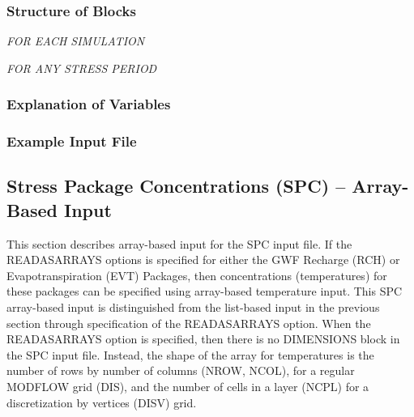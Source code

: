 \vspace{5mm}
\subsubsection{Structure of Blocks}
\vspace{5mm}

\noindent \textit{FOR EACH SIMULATION}


\vspace{5mm}
\noindent \textit{FOR ANY STRESS PERIOD}


\vspace{5mm}
\subsubsection{Explanation of Variables}
\begin{description}

\end{description}

\subsubsection{Example Input File}


\newpage
\subsection{Stress Package Concentrations (SPC) -- Array-Based Input}

This section describes array-based input for the SPC input file.  If the READASARRAYS options is specified for either the GWF Recharge (RCH) or Evapotranspiration (EVT) Packages, then concentrations (temperatures) for these packages can be specified using array-based temperature input.  This SPC array-based input is distinguished from the list-based input in the previous section through specification of the READASARRAYS option.  When the READASARRAYS option is specified, then there is no DIMENSIONS block in the SPC input file.  Instead, the shape of the array for temperatures is the number of rows by number of columns (NROW, NCOL), for a regular MODFLOW grid (DIS), and the number of cells in a layer (NCPL) for a discretization by vertices (DISV) grid.

